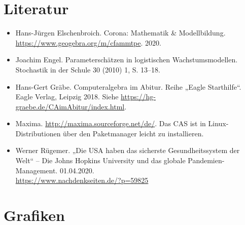 \documentclass[a4paper,11pt]{article}
\begin{document}
\section{Literatur}

\begin{itemize}
\item Hans-Jürgen Elschenbroich. Corona: Mathematik \& Modellbildung.\\
  \url{https://www.geogebra.org/m/cfammtpe}.  2020.
\item Joachim Engel. Parameterschätzen in logistischen Wachstumsmodellen.
  Stochastik in der Schule 30 (2010) 1, S. 13–18.
\item Hans-Gert Gräbe. Computeralgebra im Abitur. Reihe „Eagle Starthilfe“.
  Eagle Verlag, Leipzig 2018.  Siehe
  \url{https://hg-graebe.de/CAimAbitur/index.html}.
\item Maxima. \url{http://maxima.sourceforge.net/de/}. Das CAS ist in
  Linux-Distributionen über den Paketmanager leicht zu installieren.
\item Werner Rügemer. „Die USA haben das sicherste Gesundheitssystem der Welt“
  – Die Johns Hopkins University und das globale Pandemien-Management.
  01.04.2020.\\ \url{https://www.nachdenkseiten.de/?p=59825}
\end{itemize}

\section{Grafiken}
\end{document}
